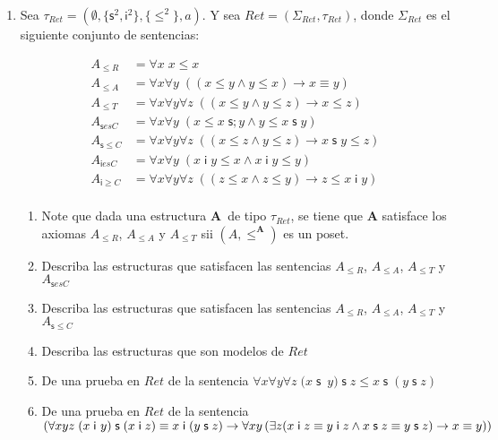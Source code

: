 \documentclass{article}
\newcommand{\refl}{\forall x\;x\leq x}
\newcommand{\Nrefl}{{A}_{\leq R}}
\newcommand{\anti}{\forall x\forall y\;\left( \left( x\leq y\wedge y\leq
x\right) \rightarrow x\equiv y\right)}
\newcommand{\Nanti}{{A}_{\leq A}}
\newcommand{\trans}{\forall x\forall y\forall z\;\left( (x\leq y\wedge
y\leq z)\rightarrow x\leq z\right)}
\newcommand{\Ntrans}{{A}_{\leq T}}
\newcommand{\sCot}{\forall x\forall y\;(x\leq x\;\mathsf{s} ;y\wedge y\leq x\;\mathsf{s}\;y)}
\newcommand{\NsCot}{{A}_{\mathsf{s}esC}}
\newcommand{\sLesCot}{\forall x\forall y\forall z\;\left( (x\leq
z\wedge y\leq z)\rightarrow x\;\text{$\mathsf{s\;}$}y\leq z\right)}
\newcommand{\NsLesCot}{{A}_{\mathsf{s}\leq C}}
\newcommand{\iCot}{\forall x\forall y\;(x\;\mathsf{i}\;y\leq
x\wedge x\;\mathsf{i}\;y\leq y)}
\newcommand{\NiCot}{{A}_{\mathsf{i}esC}}
\newcommand{\iGrCot}{\forall x\forall y\forall z\;\left( (z\leq
x\wedge z\leq y)\rightarrow z\leq x\;\mathsf{i}\;y\right)}
\newcommand{\NiGrCot}{{A}_{\mathsf{i}\geq C}}
\newcommand{\Tau}{\tau _{Ret}}
\newcommand{\Poset}{(A,\leq ^{\mathbf{A}})}
\newcommand{\assoc}{\forall x\forall y\forall
z\;(x\;\mathsf{s}$\ $y)\;\mathsf{s}\;z\leq x\;\mathsf{s}\;(y\;\mathsf{s}\;z)}
\newcommand{\acot}{(\forall xyz\;(x\;\mathsf{i}\
y)\;\mathsf{s}\;(x\;\mathsf{i}\;z)\equiv x\;\mathsf{i}\;(y\;\mathsf{s}%
\;z)\rightarrow \forall xy\left( \exists z(x\;\mathsf{i}\;z\equiv y\;\mathsf{%
i}\;z\wedge x\;\mathsf{s}\;z\equiv y\;\mathsf{s}\;z)\rightarrow x\equiv
y\right) )}
\begin{document}
\begin{enumerate}
\item Sea $\tau _{Ret}=(\emptyset ,\{\mathsf{s}^{2},\mathsf{i}^{2}\},\{\leq
^{2}\},a)$. Y sea $Ret=(\Sigma _{Ret},\tau _{Ret})$, donde $\Sigma _{Ret}$
es el siguiente conjunto de sentencias:%

\begin{align}
   \Nrefl &= \refl \\
   \Nanti &= \anti \\
   \Ntrans &= \trans \\
   \NsCot &= \sCot \\
   \NsLesCot &= \sLesCot \\
   \NiCot &= \iCot \\
   \NiGrCot &= \iGrCot \\
\end{align}




\begin{enumerate}
\item Note que dada una estructura $\mathbf{A}$\ de tipo $\Tau$, se
tiene que $\mathbf{A}$ satisface los axiomas $\Nrefl$, $\Nanti$ y $\Ntrans$
sii $\Poset$ es un poset.

\item Describa las estructuras que satisfacen las sentencias $\Nrefl$,
$\Nanti$, $\Ntrans$ y $\NsCot$

\item Describa las estructuras que satisfacen las sentencias $\Nrefl$,
$\Nanti$, $\Ntrans$ y $\NsLesCot$

\item Describa las estructuras que son modelos de $Ret$

\item De una prueba en $Ret$ de la sentencia $\assoc$

\item De una prueba en $Ret$ de la sentencia \\ $\acot$
\end{enumerate}
\end{enumerate}
\end{document}
